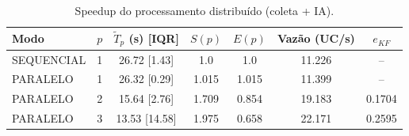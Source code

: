 \begin{table}[ht]
\centering
\caption{Speedup do processamento distribuído (coleta + IA).}
\label{tab:speedup}
\begin{tabular}{lcccccc}
\hline
Modo & $p$ & $\tilde T_p$ (s) [IQR] & $S(p)$ & $E(p)$ & Vazão (UC/s) & $e_{KF}$ \\
\hline
SEQUENCIAL & 1 & 26.72 [1.43] & 1.0 & 1.0 & 11.226 & -- \\
PARALELO & 1 & 26.32 [0.29] & 1.015 & 1.015 & 11.399 & -- \\
PARALELO & 2 & 15.64 [2.76] & 1.709 & 0.854 & 19.183 & 0.1704 \\
PARALELO & 3 & 13.53 [14.58] & 1.975 & 0.658 & 22.171 & 0.2595 \\
\hline
\end{tabular}
\end{table}
